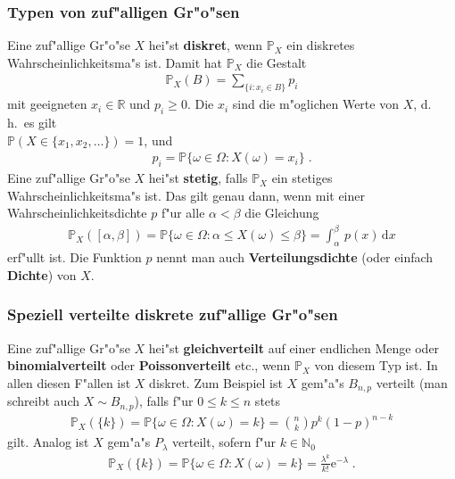 \documentclass[ngerman,draft,parskip=half,twoside]{scrartcl}
\newcommand*{\R}{\mathbb{R}}      %
\newcommand*{\N}{\mathbb{N}}      %
\newcommand*{\WKM}{\mathbb{P}}      %
\begin{document}
\subsubsection{Typen von zuf"alligen Gr"o"sen}
Eine zuf"allige Gr"o"se $X$ hei"st \textbf{diskret}, wenn $\WKM_X$ ein diskretes
Wahrscheinlichkeitsma"s ist. Damit hat $\WKM_X$ die Gestalt
\begin{gather*}
  \WKM_X(B)=\sum_{\{i\colon x_i\in  B\}} p_i
\end{gather*}
mit geeigneten $x_i\in\R$ und $p_i\ge 0$. Die $x_i$ sind die m"oglichen Werte von $X$, d.\,h.~es
gilt\\ $\WKM(X\in\{x_1,x_2,\ldots\})=1$,
und
\begin{gather*}
  p_i=\WKM\{\omega\in\Omega \colon X(\omega)=x_i\}\;.
\end{gather*}
Eine zuf"allige Gr"o"se $X$ hei"st \textbf{stetig}, falls $\WKM_X$ ein stetiges Wahrscheinlichkeitsma"s
ist. Das gilt genau dann, wenn mit einer Wahrscheinlichkeitsdichte $p$ f"ur alle $\alpha<\beta$
die Gleichung
\begin{gather*}
  \WKM_X([\alpha,\beta])=\WKM\{\omega\in\Omega \colon \alpha\le X(\omega)\le\beta\}=\int_\alpha^\beta\,p(x)\,
     \mathrm d x
\end{gather*}
erf"ullt ist. Die Funktion $p$ nennt man auch \textbf{Verteilungsdichte} (oder einfach
\textbf{Dichte}) von $X$.
\subsubsection{Speziell verteilte diskrete zuf"allige Gr"o"sen}
Eine zuf"allige Gr"o"se $X$ hei"st \textbf{gleichverteilt}
 auf einer endlichen Menge oder \textbf{binomialverteilt}
oder \textbf{Poissonverteilt} etc., wenn $\WKM_X$ von diesem Typ ist. In allen diesen F"allen
ist $X$ diskret. Zum Beispiel ist $X$ gem"a"s $B_{n,p}$ verteilt (man schreibt auch
$X\sim B_{n,p}$), falls f"ur $0\le k\le n$ stets
\begin{gather*}
  \WKM_X(\{k\})=\WKM\{\omega\in\Omega \colon X(\omega)=k\} = {n \choose k} p^k(1-p)^{n-k}
\end{gather*}
gilt. Analog ist $X$ gem"a"s $P_\lambda$ verteilt, sofern f"ur $k\in\N_0$
\begin{gather*}
  \WKM_X(\{k\})=\WKM\{\omega\in\Omega \colon X(\omega)=k\}=\frac{\lambda^k}{k!}\mathrm e^{-\lambda}\;.
\end{gather*}
\end{document}
